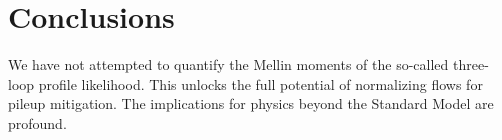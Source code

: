 \section{Conclusions}\label{sec:conclusions}

We have not attempted to quantify the Mellin moments of the so-called
three-loop profile likelihood. This unlocks the full potential of
normalizing flows for pileup mitigation. The implications for physics
beyond the Standard Model are profound.

